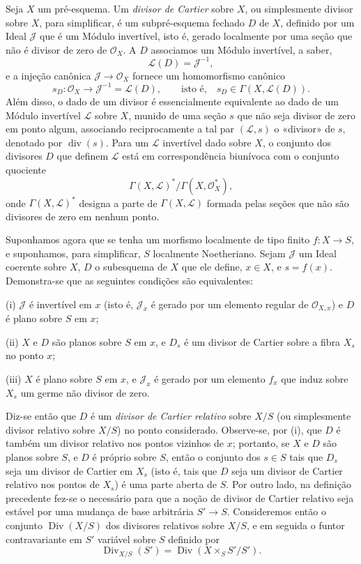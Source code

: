 Seja $X$ um pré-esquema. Um \emph{divisor de Cartier} sobre $X$, ou simplesmente
divisor sobre $X$, para simplificar, é um subpré-esquema fechado $D$ de $X$,
definido por um Ideal $\mathcal J$ que é um Módulo invertível, isto é, gerado
localmente por uma seção que não é divisor de zero de $\mathcal O_X$. A $D$
associamos um Módulo invertível, a saber,
\[
\mathcal L(D)=\mathcal J^{-1},
\]
e a injeção canônica $\mathcal J\longrightarrow\mathcal O_X$ fornece um
homomorfismo canônico
\[
s_D:\mathcal O_X\longrightarrow\mathcal J^{-1}=\mathcal L(D),
\qquad\text{isto é,}\quad s_D\in\Gamma(X,\mathcal L(D)).
\]
Além disso, o dado de um divisor é essencialmente equivalente ao dado de um
Módulo invertível $\mathcal L$ sobre $X$, munido de uma seção $s$ que não seja
divisor de zero em ponto algum, associando reciprocamente a tal par
$(\mathcal L,s)$ o «divisor» de $s$, denotado por $\operatorname{div}(s)$. Para
um $\mathcal L$ invertível dado sobre $X$, o conjunto dos
divisores $D$ que definem $\mathcal L$ está em correspondência biunívoca com o
conjunto quociente
\[
\Gamma(X,\mathcal L)^*/\Gamma(X,\mathcal O_X^*),
\]
onde $\Gamma(X,\mathcal L)^*$ designa a parte de $\Gamma(X,\mathcal L)$ formada
pelas seções que não são divisores de zero em nenhum ponto.

Suponhamos agora que se tenha um morfismo localmente de tipo finito
$f:X\longrightarrow S$, e suponhamos, para simplificar, $S$ localmente
Noetheriano. Sejam $\mathcal J$ um Ideal coerente sobre $X$, $D$ o subesquema de
$X$ que ele define, $x\in X$, e $s=f(x)$. Demonstra-se que as seguintes
condições são equivalentes:

\noindent (i) $\mathcal J$ é invertível em $x$ (isto é, $\mathcal J_x$ é gerado
por um elemento regular de $\mathcal O_{X,x}$) e $D$ é plano sobre $S$ em $x$;

\noindent (ii) $X$ e $D$ são planos sobre $S$ em $x$, e $D_s$ é um divisor de
Cartier sobre a fibra $X_s$ no ponto $x$;

\noindent (iii) $X$ é plano sobre $S$ em $x$, e $\mathcal J_x$ é gerado por um
elemento $f_x$ que induz sobre $X_s$ um germe não divisor de zero.

Diz-se então que $D$ é um \emph{divisor de Cartier relativo} sobre $X/S$ (ou
simplesmente divisor relativo sobre $X/S$) no ponto considerado. Observe-se, por
(i), que $D$ é também um divisor relativo nos pontos vizinhos de $x$; portanto,
se $X$ e $D$ são planos sobre $S$, e $D$ é próprio sobre $S$, então o conjunto
dos $s\in S$ tais que $D_s$ seja um divisor de Cartier em $X_s$ (isto é, tais
que $D$ seja um divisor de Cartier relativo nos pontos de $X_s$) é uma parte
aberta de $S$. Por outro lado, na definição precedente fez-se o necessário para
que a noção de divisor de Cartier relativo seja estável por uma mudança de base
arbitrária $S'\longrightarrow S$. Consideremos então o conjunto
$\operatorname{Div}(X/S)$ dos divisores relativos sobre $X/S$, e em seguida o
funtor contravariante em $S'$ variável sobre $S$ definido por
\[
\operatorname{Div}_{X/S}(S')=
\operatorname{Div}(X\times_SS'/S').
\]

